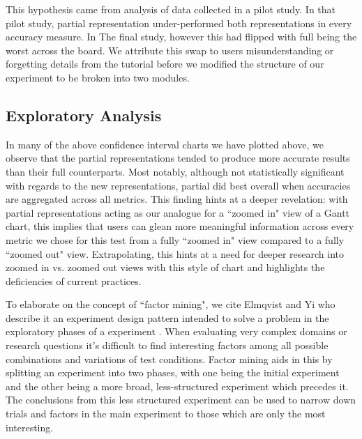     This hypothesis came from analysis of data collected in a pilot study. In that pilot study, partial representation under-performed both representations in every accuracy measure. In The final study, however this had flipped with full being the worst across the board. We attribute this swap to users misunderstanding or forgetting details from the tutorial before we modified the structure of our experiment to be broken into two modules.


% 
\subsection{Exploratory Analysis }
    
    In many of the above confidence interval charts we have plotted above, we observe that the partial representations tended to produce more accurate results than their full counterparts. Most notably, although not statistically significant with regards to the new representations, partial did best overall when accuracies are aggregated across all metrics. This finding hints at a deeper revelation:  with partial representations acting as our analogue for a ``zoomed in" view of a Gantt chart, this implies that users can glean more meaningful information across every metric we chose for this test from a fully ``zoomed in" view compared to a fully ``zoomed out" view. Extrapolating, this hints at a need for deeper research into zoomed in vs. zoomed out views with this style of chart and highlights the deficiencies of current practices. 
   

    
    
    
    
    To elaborate on the concept of ``factor mining", we cite Elmqvist and Yi who describe it an experiment design pattern intended to solve a problem in the exploratory phases of a experiment \cite{elmqvist2015patterns}. When evaluating very complex domains or research questions it's difficult to find interesting factors among all possible combinations and variations of test conditions. Factor mining aids in this by splitting an experiment into two phases, with one being the initial experiment and the other being a more broad, less-structured experiment which precedes it. The conclusions from this less structured experiment can be used to narrow down trials and factors in the main experiment to those which are only the most interesting.


